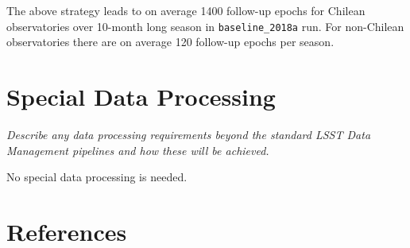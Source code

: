 \documentclass[12pt,letterpaper]{article}
\begin{document}
The above strategy leads to on average 1400 follow-up epochs for 
Chilean observatories over 10-month long season in {\tt baseline\_2018a} run. 
For non-Chilean observatories there are on average 120 follow-up 
epochs per season.  



\vspace{.6in}

\section{Special Data Processing}
\begin{footnotesize}
{\it Describe any data processing requirements beyond the standard LSST Data Management pipelines and how these will be achieved.}
\end{footnotesize}

No special data processing is needed. %



\section{References}
\end{document}
